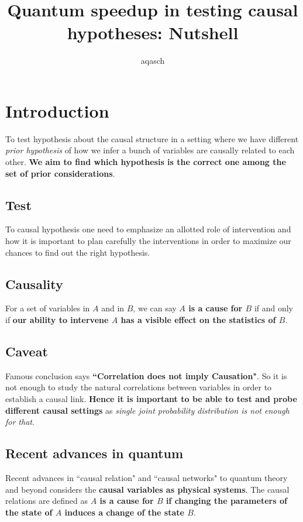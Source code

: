 \documentclass[a4paper,11pt]{article}
\begin{document}
	
	\title{Quantum speedup in testing causal hypotheses: Nutshell}
	\author{aqasch}
	\date{}
	\maketitle
	\section{Introduction}
	To test hypothesis about the causal structure in a setting where we have different \textit{prior hypothesis} of how we infer a bunch of variables are causally related to each other. \textbf{We aim to find which hypothesis is the correct one among the set of prior considerations}.
	
	\subsection{Test} To causal hypothesis one need to emphasize an allotted role of intervention and how it is important to plan carefully the interventions in order to maximize our chances to find out the right hypothesis.
	
	\subsection{Causality} For a set of variables in $A$ and in $B$, we can say \textbf{$A$ is a cause for $B$} if and only if \textbf{our ability to intervene $A$ has a visible effect on the statistics of $B$}.
	
	\subsection{Caveat} Famous conclusion says \textbf{``Correlation does not imply Causation"}. So it is not enough to study the natural correlations between variables in order to establish a causal link. \textbf{Hence it is important to be able to test and probe different causal settings} as \textit{single joint probability distribution is not enough for that}.
	
	\subsection{Recent advances in quantum}
	Recent advances in ``causal relation" and ``causal networks" to quantum theory and beyond considers the \textbf{causal variables as physical systems}. The causal relations are defined as \textbf{$A$ is a cause for $B$ if changing the parameters of the state of $A$ induces a change of the state $B$}.
	
\end{document}

